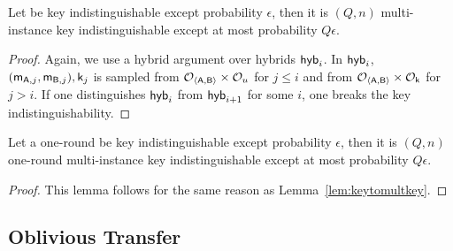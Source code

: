 \begin{lemma}\label{lem:keytomultkey}
Let \UKA be key indistinguishable except probability $\epsilon$, then it is $(Q,n)$ multi-instance key indistinguishable except at most probability $Q\epsilon$. 
\end{lemma}

\begin{proof}
Again, we use a hybrid argument over hybrids $\mathsf{hyb}_i$. In $\mathsf{hyb}_i$, $(\mathsf{m}_{\mathsf{A},j},\mathsf{m}_{\mathsf{B},j}),\mathsf{k}_j$ is sampled from $\mathcal{O}_{\langle \mathsf{A},\mathsf{B}\rangle}\times\mathcal{O}_u$ for $j\leq i$ and from $\mathcal{O}_{\langle \mathsf{A},\mathsf{B}\rangle}\times\mathcal{O}_\mathsf{k}$ for $j>i$. If one distinguishes $\mathsf{hyb}_i$ from $\mathsf{hyb}_{i+1}$ for some $i$, one breaks the key indistinguishability. 
\end{proof}

\begin{lemma}\label{lem:oneroundkeytomultkey}
Let a one-round \UKA be key indistinguishable except probability $\epsilon$, then it is $(Q,n)$ one-round multi-instance key indistinguishable except at most probability $Q\epsilon$. 
\end{lemma}

\begin{proof}
This lemma follows for the same reason as Lemma~\ref{lem:keytomultkey}.
\end{proof}

\subsection{Oblivious Transfer}



